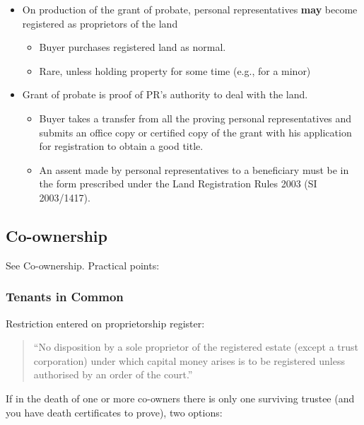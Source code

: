 \documentclass[
]{article}
\providecommand{\tightlist}{%
  \setlength{\itemsep}{0pt}\setlength{\parskip}{0pt}}
\begin{document}
\begin{itemize}
\tightlist
\item
  On production of the grant of probate, personal representatives
  \textbf{may} become registered as proprietors of the land

  \begin{itemize}
  \tightlist
  \item
    Buyer purchases registered land as normal.
  \item
    Rare, unless holding property for some time (e.g., for a minor)
  \end{itemize}
\item
  Grant of probate is proof of PR's authority to deal with the land.

  \begin{itemize}
  \tightlist
  \item
    Buyer takes a transfer from all the proving personal representatives
    and submits an office copy or certified copy of the grant with his
    application for registration to obtain a good title.
  \item
    An assent made by personal representatives to a beneficiary must be
    in the form prescribed under the Land Registration Rules 2003 (SI
    2003/1417).
  \end{itemize}
\end{itemize}

\hypertarget{co-ownership}{%
\subsection{Co-ownership}\label{co-ownership}}

See Co-ownership. Practical points:

\hypertarget{tenants-in-common}{%
\subsubsection{Tenants in Common}\label{tenants-in-common}}

Restriction entered on proprietorship register:

\begin{quote}
``No disposition by a sole proprietor of the registered estate (except a
trust corporation) under which capital money arises is to be registered
unless authorised by an order of the court.''
\end{quote}

If in the death of one or more co-owners there is only one surviving
trustee (and you have death certificates to prove), two options:
\end{document}
